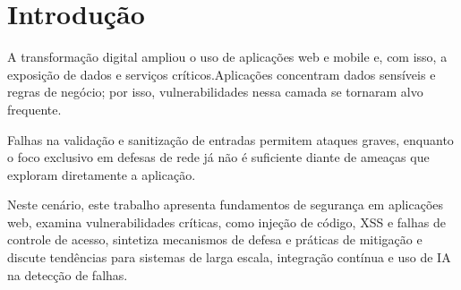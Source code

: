 \section{
    Introdução
} \label{sec:introducao}

A transformação digital ampliou o uso de aplicações web e mobile e, com isso, a exposição de dados e serviços críticos.Aplicações concentram dados sensíveis e regras de negócio; por isso, vulnerabilidades nessa camada se tornaram alvo frequente.

Falhas na validação e sanitização de entradas permitem ataques graves, enquanto o foco exclusivo em defesas de rede já não é suficiente diante de ameaças que exploram diretamente a aplicação.

Neste cenário, este trabalho apresenta fundamentos de segurança em aplicações web, examina vulnerabilidades críticas, como injeção de código, XSS e falhas de controle de acesso, sintetiza mecanismos de defesa e práticas de mitigação e discute tendências para sistemas de larga escala, integração contínua e uso de IA na detecção de falhas.
